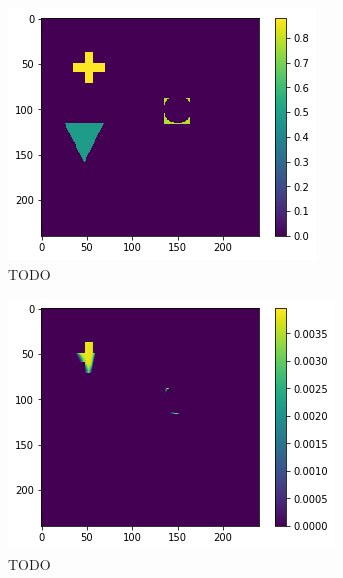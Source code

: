 \begin{figure}[H]
    \centering
    \begin{subfigure}[t]{.33\textwidth}
        \centering
        \includegraphics[width=\linewidth]{chapters/06_hdm/images_analyze/0a_masked.png}
        \caption{TODO}
    \end{subfigure}%
    \begin{subfigure}[t]{.33\textwidth}
        \centering
        \includegraphics[width=\linewidth]{chapters/06_hdm/images_analyze/0b_segment.png}
        \caption{TODO}
    \end{subfigure}
    \begin{subfigure}[t]{.33\textwidth}

\end{subfigure}
\end{figure}
